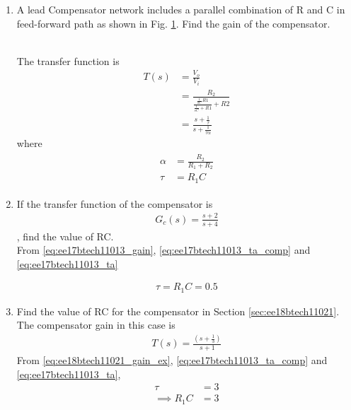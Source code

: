 \begin{enumerate}[label=\thesubsection.\arabic*.,ref=\thesubsection.\theenumi]

\item    A lead Compensator network includes a parallel combination of R and C in feed-forward path as shown in Fig. \ref{fig:ee17btech11013}. Find the gain of the compensator.
\begin{figure}[!ht]
    \begin{center}
    \resizebox{\columnwidth}{!}{}
    \end{center}
\caption{}
\label{fig:ee17btech11013}
\end{figure}
\\
\solution The transfer function  is
    \begin{align}
    T(s) &= \frac{V_o}{V_i}
\\
&= \frac{R_2}{\frac{\frac{1}{sC}R1}{\frac{1}{sC}+R1} + R2}
\\
&= \frac{s+\frac{1}{\tau}}{s+\frac{1}{\tau\alpha}}
\label{eq:ee17btech11013_ta_comp}
    \end{align}
%
where
    \begin{align}
\label{eq:ee17btech11013_ta}
\begin{split}
    \alpha &= \frac{R_2}{R_1 + R_2}\\
    \tau &= R_1C
\end{split}
    \end{align}
\item If the transfer function of the compensator  is 
\begin{align}
\label{eq:ee17btech11013_gain}
G_c(s) = \frac{s+2}{s+4}
\end{align}, find the value of RC.
%
\\
\solution     From \eqref{eq:ee17btech11013_gain}, \eqref{eq:ee17btech11013_ta_comp}
 and \eqref{eq:ee17btech11013_ta}


\begin{align}
    \tau = R_1C = 0.5
    \end{align}

\item    Find the value of RC for the compensator in Section \ref{sec:ee18btech11021}.
\\
\solution The compensator gain in this case is 
     \begin{align}
\label{eq:ee18btech11021_gain_ex}
    T(s) = \frac{(s+\frac{1}{3})}{s+1}
    \end{align}
 From \eqref{eq:ee18btech11021_gain_ex}, 
 \eqref{eq:ee17btech11013_ta_comp}
 and \eqref{eq:ee17btech11013_ta},
    \begin{align}
    \tau &= 3
\\
\implies    R_1C &= 3
    \end{align}

\end{enumerate}

